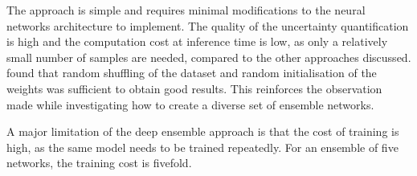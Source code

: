 The approach is simple and requires minimal modifications to the neural networks architecture to implement. The quality
of the uncertainty quantification is high and the computation cost at inference time is low, as only a relatively small
number of samples are needed, compared to the other approaches discussed.
\textcite{lakshminarayananSimpleScalablePredictive2017} found that random shuffling of the dataset and random
initialisation of the weights was sufficient to obtain good results. This reinforces the observation
\textcite{leeWhyHeadsAre2015} made while investigating how to create a diverse set of ensemble networks.

A major limitation of the deep ensemble approach is that the cost of training is high, as the same model needs to be
trained repeatedly. For an ensemble of five networks, the training cost is fivefold. 
